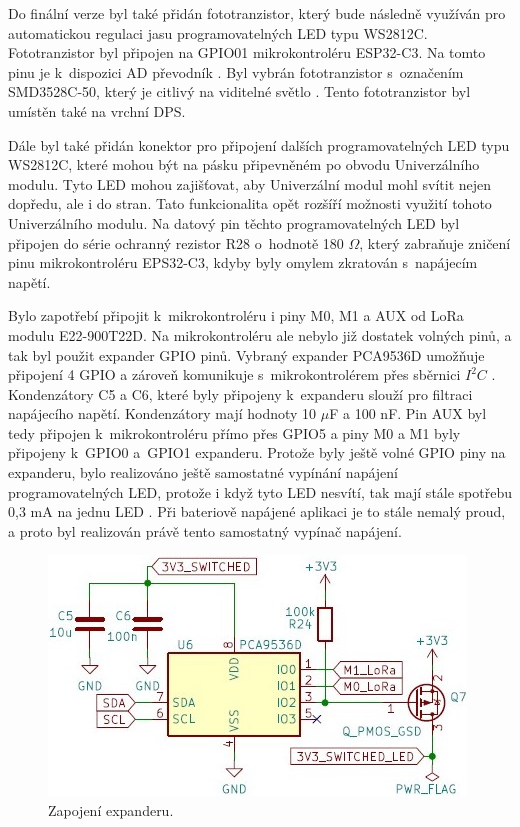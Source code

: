 Do finální verze byl také přidán fototranzistor, který bude následně využíván pro automatickou regulaci jasu programovatelných LED typu WS2812C. Fototranzistor byl připojen na GPIO01 mikrokontroléru ESP32-C3. Na tomto 
pinu je k~dispozici AD převodník \cite{ESP_C3_dtsh}. Byl vybrán fototranzistor s~označením SMD3528C-50, který je citlivý na viditelné světlo \cite{Phototransistor}.
Tento fototranzistor byl umístěn také na vrchní DPS. 

Dále byl také 
přidán konektor pro připojení dalších programovatelných LED typu WS2812C, které mohou být na pásku připevněném po obvodu Univerzálního modulu. Tyto LED mohou zajišťovat, aby Univerzální modul mohl svítit 
nejen dopředu, ale i do stran. Tato funkcionalita opět rozšíří možnosti využití tohoto Univerzálního modulu. Na datový pin těchto programovatelných LED byl připojen do série ochranný rezistor R28 o~hodnotě 
180 $\Omega$, který 
zabraňuje zničení pinu mikrokontroléru EPS32-C3, kdyby byly omylem zkratován s~napájecím napětí. 

Bylo zapotřebí připojit k~mikrokontroléru i piny M0, M1 a AUX od LoRa modulu E22-900T22D. Na mikrokontroléru ale nebylo již dostatek volných pinů, a tak byl použit expander GPIO pinů. Vybraný expander
PCA9536D umožňuje připojení 4 GPIO a zároveň komunikuje s~mikrokontrolérem přes sběrnici $I^2C$ \cite{expander}. Kondenzátory C5 a C6, které byly připojeny k~expanderu slouží pro filtraci napájecího napětí. 
Kondenzátory mají hodnoty 10 $\mu$F a 100 nF. Pin AUX byl tedy připojen k~mikrokontroléru přímo přes GPIO5 a piny M0 a M1 byly připojeny k~GPIO0 
a~GPIO1 expanderu. Protože byly ještě volné GPIO piny na expanderu, bylo realizováno ještě samostatné vypínání napájení programovatelných LED, protože i když tyto LED nesvítí, tak mají stále spotřebu 
0,3 mA na jednu LED \cite{WS2812C_dtsh}. Při bateriově napájené aplikaci je to stále nemalý proud, a proto byl realizován právě tento samostatný vypínač napájení. 

\begin{figure}[!h]
  \begin{center}
    \includegraphics[scale=0.8]{obrazky/expander.jpg}
  \end{center}
  \caption[Zapojení expanderu]{Zapojení expanderu.}
\end{figure}

